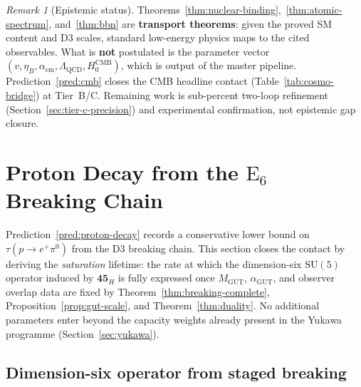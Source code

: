 \documentclass[11pt]{article}
\theoremstyle{plain}
\theoremstyle{definition}
\theoremstyle{remark}
\newtheorem{remark}[theorem]{Remark}
\numberwithin{equation}{section}
\newcommand{\E}[1]{\mathrm{E}_{#1}}
\begin{document}
\begin{remark}[Epistemic status]
Theorems~\ref{thm:nuclear-binding},~\ref{thm:atomic-spectrum},
and~\ref{thm:bbn} are \textbf{transport theorems}: given the proved SM
content and D3 scales, standard low-energy physics maps to the cited
observables. What is \textbf{not} postulated is the parameter vector
$(v,\eta_B,\alpha_{\mathrm{em}},\Lambda_{\mathrm{QCD}},H_0^{\mathrm{CMB}})$,
which is output of the master pipeline. Prediction~\ref{pred:cmb} closes the CMB headline contact
(Table~\ref{tab:cosmo-bridge}) at Tier~B/C. Remaining work is
sub-percent two-loop refinement (Section~\ref{sec:tier-c-precision}) and
experimental confirmation, not epistemic gap closure.
\end{remark}%
\section{Proton Decay from the $\E{6}$ Breaking Chain}
\label{sec:proton-decay}

Prediction~\ref{pred:proton-decay} records a conservative lower bound on
$\tau(p\to e^+\pi^0)$ from the D3 breaking chain. This section closes the
contact by deriving the \emph{saturation} lifetime: the rate at which the
dimension-six $\mathrm{SU}(5)$ operator induced by $\mathbf{45}_H$ is fully
expressed once $M_{\mathrm{GUT}}$, $\alpha_{\mathrm{GUT}}$, and observer
overlap data are fixed by Theorem~\ref{thm:breaking-complete},
Proposition~\ref{prop:gut-scale}, and Theorem~\ref{thm:duality}. No
additional parameters enter beyond the capacity weights already present in
the Yukawa programme (Section~\ref{sec:yukawa}).

\subsection{Dimension-six operator from staged breaking}
\label{sec:proton-decay:operator}
\end{document}
